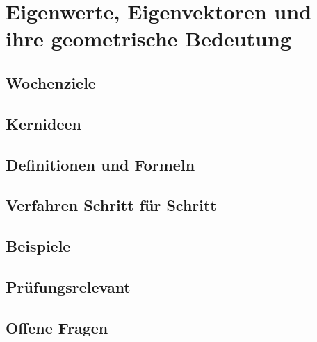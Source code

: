 \chapter{Eigenwerte, Eigenvektoren und ihre geometrische Bedeutung}
\label{kap:08-eigenwerte}

\section*{Wochenziele}
\begin{wochenziele}
\end{wochenziele}

\section{Kernideen}

\section{Definitionen und Formeln}

\section{Verfahren Schritt für Schritt}

\section{Beispiele}

\section{Prüfungsrelevant}

\section{Offene Fragen}
